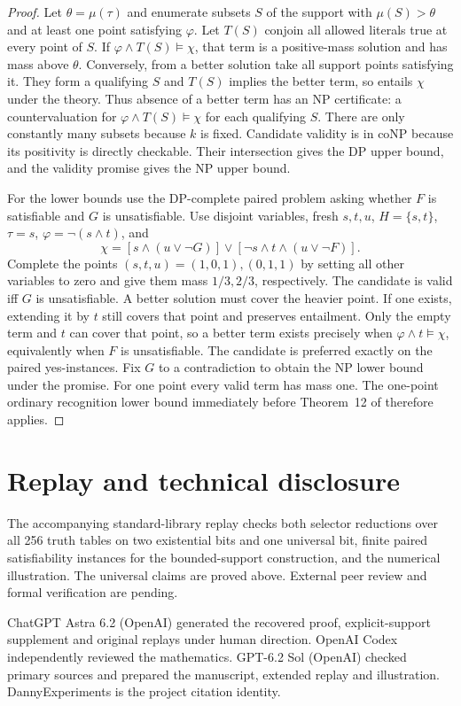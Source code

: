 \documentclass[11pt,a4paper]{amsart}
\newcommand{\DP}{\mathrm{DP}}
\newcommand{\NP}{\mathrm{NP}}
\newcommand{\coNP}{\mathrm{coNP}}
\begin{document}
\begin{proof}
Let $\theta=\mu(\tau)$ and enumerate subsets $S$ of the support with $\mu(S)>\theta$ and at least one point satisfying $\varphi$. Let $T(S)$ conjoin all allowed literals true at every point of $S$. If $\varphi\land T(S)\models\chi$, that term is a positive-mass solution and has mass above $\theta$. Conversely, from a better solution take all support points satisfying it. They form a qualifying $S$ and $T(S)$ implies the better term, so entails $\chi$ under the theory. Thus absence of a better term has an $\NP$ certificate: a countervaluation for $\varphi\land T(S)\models\chi$ for each qualifying $S$. There are only constantly many subsets because $k$ is fixed. Candidate validity is in $\coNP$ because its positivity is directly checkable. Their intersection gives the $\DP$ upper bound, and the validity promise gives the $\NP$ upper bound.

For the lower bounds use the $\DP$-complete paired problem asking whether $F$ is satisfiable and $G$ is unsatisfiable. Use disjoint variables, fresh $s,t,u$, $H=\{s,t\}$, $\tau=s$, $\varphi=\neg(s\land t)$, and
\[
\chi=[s\land(u\lor\neg G)]\lor[\neg s\land t\land(u\lor\neg F)].
\]
Complete the points $(s,t,u)=(1,0,1),(0,1,1)$ by setting all other variables to zero and give them mass $1/3,2/3$, respectively. The candidate is valid iff $G$ is unsatisfiable. A better solution must cover the heavier point. If one exists, extending it by $t$ still covers that point and preserves entailment. Only the empty term and $t$ can cover that point, so a better term exists precisely when $\varphi\land t\models\chi$, equivalently when $F$ is unsatisfiable. The candidate is preferred exactly on the paired yes-instances. Fix $G$ to a contradiction to obtain the $\NP$ lower bound under the promise. For one point every valid term has mass one. The one-point ordinary recognition lower bound immediately before Theorem~12 of \cite[p.~323]{fik} therefore applies.
\end{proof}

\section*{Replay and technical disclosure}
The accompanying standard-library replay checks both selector reductions over all 256 truth tables on two existential bits and one universal bit, finite paired satisfiability instances for the bounded-support construction, and the numerical illustration. The universal claims are proved above. External peer review and formal verification are pending.

ChatGPT Astra 6.2 (OpenAI) generated the recovered proof, explicit-support supplement and original replays under human direction. OpenAI Codex independently reviewed the mathematics. GPT-6.2 Sol (OpenAI) checked primary sources and prepared the manuscript, extended replay and illustration. DannyExperiments is the project citation identity.



\end{document}
